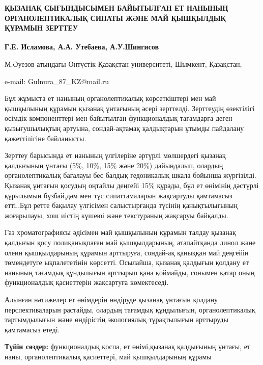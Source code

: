 \begin{articleheader}
{\bfseries ҚЫЗАНАҚ СЫҒЫНДЫСЫМЕН БАЙЫТЫЛҒАН ЕТ НАНЫНЫҢ ОРГАНОЛЕПТИКАЛЫҚ СИПАТЫ ЖӘНЕ МАЙ ҚЫШҚЫЛДЫҚ ҚҰРАМЫН ЗЕРТТЕУ}

{\bfseries
Г.Е. Исламова\textsuperscript{\envelope },
А.А. Утебаева,
А.У.Шингисов
}
\end{articleheader}

\begin{affiliation}
М.Әуезов атындағы Оңтүстік Қазақстан университеті, Шымкент, Қазақстан,

e-mail: Gulnura\_87\_KZ@mail.ru
\end{affiliation}

Бұл жұмыста ет нанының органолептикалық көрсеткіштері мен май қышқылының
құрамын қызанақ ұнтағының әсері зерттелді. Зерттеудің өзектілігі өсімдік
компоненттері мен байытылған функционалдық тағамдарға деген
қызығушылықтың артуына, сондай-ақтамақ қалдықтарын ұтымды пайдалану
қажеттілігіне байланысты.

Зерттеу барысында ет нанының үлгілеріне әртүрлі мөлшердегі қызанақ
қалдығының ұнтағы (5\%, 10\%, 15\% және 20\%) дайындалып, олардың
органолептикалық бағалауы бес балдық гедоникалық шкала бойынша
жүргізілді. Қызанақ ұнтағын қосудың оңтайлы деңгейі 15\% құрады, бұл ет
өнімінің дәстүрлі құрылымын бұзбай,дәм мен түс сипаттамаларын жақсартуды
қамтамасыз етті..Бұл ретте бақылау үлгісімен салыстырғанда түсінің
қанықтылығының жоғарылауы, хош иістің күшеюі және текстураның жақсаруы
байқалды.

Газ хроматографиясы әдісімен май қышқылының құрамын талдау қызанақ
қалдығын қосу полиқанықпаған май қышқылдарының, атапайтқанда линол және
олеин қышқылдарының құрамын арттыруға, сондай-ақ қаныққан май деңгейін
төмендетуге ықпалететінін көрсетті. Осылайша, қызанақ қалдығын қолдану
ет нанының тағамдық құндылығын арттырып қана қоймайды, сонымен қатар
оның функционалдық қасиеттерін жақсартуға көмектеседі.

Алынған нәтижелер ет өнімдерін өндіруде қызанақ ұнтағын қолдану
перспективаларын растайды, олардың тағамдық құндылығын, органолептикалық
тартымдылығын және өндірістің экологиялық тұрақтылығын арттыруды
қамтамасыз етеді.

{\bfseries Түйін сөздер:} функционалдық қоспа, ет өнімі,қызанақ қалдығының
ұнтағы, ет наны, органолептикалық қасиеттері, май қышқылдарының құрамы

